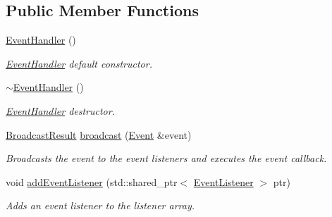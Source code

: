 \subsection*{Public Member Functions}
\begin{DoxyCompactItemize}
\item 
\mbox{\label{class_arcana_1_1_event_handler_abad62db95c13588434b896f7ca556049}} 
\mbox{\hyperlink{class_arcana_1_1_event_handler_abad62db95c13588434b896f7ca556049}{Event\+Handler}} ()
\begin{DoxyCompactList}\small\item\em \mbox{\hyperlink{class_arcana_1_1_event_handler}{Event\+Handler}} default constructor. \end{DoxyCompactList}\item 
\mbox{\label{class_arcana_1_1_event_handler_aac9a6d2645d3a74b3b46a10381436c84}} 
\mbox{\hyperlink{class_arcana_1_1_event_handler_aac9a6d2645d3a74b3b46a10381436c84}{$\sim$\+Event\+Handler}} ()
\begin{DoxyCompactList}\small\item\em \mbox{\hyperlink{class_arcana_1_1_event_handler}{Event\+Handler}} destructor. \end{DoxyCompactList}\item 
\mbox{\label{class_arcana_1_1_event_handler_a1786d06628a98005c406020772adb84a}} 
\mbox{\hyperlink{class_arcana_1_1_event_handler_1_1_broadcast_result}{Broadcast\+Result}} \mbox{\hyperlink{class_arcana_1_1_event_handler_a1786d06628a98005c406020772adb84a}{broadcast}} (\mbox{\hyperlink{class_arcana_1_1_event}{Event}} \&event)
\begin{DoxyCompactList}\small\item\em Broadcasts the event to the event listeners and executes the event callback. \end{DoxyCompactList}\item 
\mbox{\label{class_arcana_1_1_event_handler_ae8a53585c131b63aedf362b10c5fbf0f}} 
void \mbox{\hyperlink{class_arcana_1_1_event_handler_ae8a53585c131b63aedf362b10c5fbf0f}{add\+Event\+Listener}} (std\+::shared\+\_\+ptr$<$ \mbox{\hyperlink{class_arcana_1_1_event_listener}{Event\+Listener}} $>$ ptr)
\begin{DoxyCompactList}\small\item\em Adds an event listener to the listener array. \end{DoxyCompactList}\end{DoxyCompactItemize}



